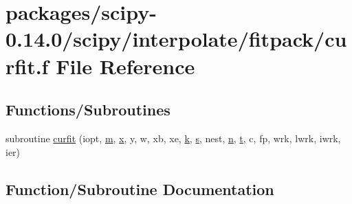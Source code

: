 \hypertarget{curfit_8f}{}\section{packages/scipy-\/0.14.0/scipy/interpolate/fitpack/curfit.f File Reference}
\label{curfit_8f}
\subsection*{Functions/\+Subroutines}
\begin{DoxyCompactItemize}
\item 
subroutine \hyperlink{curfit_8f_a89a96469f5fbfd5436793b4512a21da8}{curfit} (iopt, \hyperlink{indexexpr_8h_ab72fdb4031d47b75ab26dd18a437bcdc}{m}, \hyperlink{vecnorm1_8cc_ac73eed9e41ec09d58f112f06c2d6cb63}{x}, y, w, xb, xe, \hyperlink{indexexpr_8h_abb72938a198351550846b37a84588b63}{k}, \hyperlink{indexexpr_8h_ae024b0db549122b44c349ae28ec990dc}{s}, nest, \hyperlink{indexexpr_8h_ab427e2e2b4d6cec55fa088ea2a692ace}{n}, \hyperlink{indexexpr_8h_a01709998b82be3f34e0412206618d09d}{t}, c, fp, wrk, lwrk, iwrk, ier)
\end{DoxyCompactItemize}


\subsection{Function/\+Subroutine Documentation}
\hypertarget{curfit_8f_a89a96469f5fbfd5436793b4512a21da8}{}
